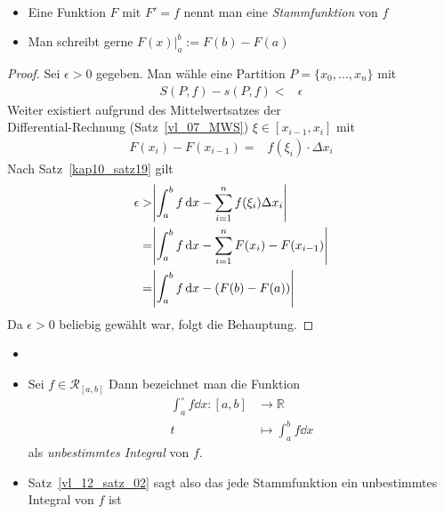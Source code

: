 \begin{Bemerkung}{
	~\begin{itemize}
		\item Eine Funktion $F$ mit $F'=f$ nennt man eine \emph{Stammfunktion} 
		von $f$
		\item Man schreibt gerne $F(x) \vert_a^b := F(b) -F(a)$
	\end{itemize}
}\end{Bemerkung}

\begin{proof}
	Sei $\epsilon >0 $ gegeben. Man wähle eine Partition $P = \{x_0, \hdots, x_n\}$ 
	mit 
	\begin{align*}
		S(P,f) - s(P,f) < & \epsilon
	\end{align*}
	Weiter existiert aufgrund des Mittelwertsatzes der \\Differential-Rechnung
	(Satz~\ref{vl_07_MWS}) 
	$\xi \in [x_{i-1}, x_i]$ mit 
	\begin{align*}
		F(x_i) - F(x_{i-1}) = &  f(\xi_i) \cdot \Delta x_i
	\end{align*}
	Nach Satz~\ref{kap10_satz19} gilt 
	\begin{align*}
		\epsilon > & \abs{ \int_a^b f \dd{x} - \sum_{i=1}^n f(\xi_i) \Delta x_i} \\
		= & \abs{ \int_a^b f \dd{x} - \sum_{i=1}^n F(x_i) -F(x_{i-1})} \\
		= & \abs{ \int_a^b f \dd{x} - (F(b) -F(a))}
	\end{align*}
	Da $\epsilon > 0$ beliebig gewählt war, folgt die Behauptung.	
\end{proof}

\begin{Bemerkung}{
	\begin{itemize}
	\item[ ]
		\item Sei $f \in \mathcal{R}_{[a,b]}$ Dann bezeichnet man die Funktion 
		\begin{align*}
			\int_a^{\circ} f\dd{x} :  [a,b]  & \rightarrow \mathbb{R} \\
			 t & \mapsto \int_a^b f\dd{x}
		\end{align*}
		als \emph{unbestimmtes Integral} von $f$.
		\item Satz~\ref{vl_12_satz_02}
		sagt also das jede Stammfunktion ein unbestimmtes Integral von $f$ ist 
	\end{itemize}
}\end{Bemerkung}


